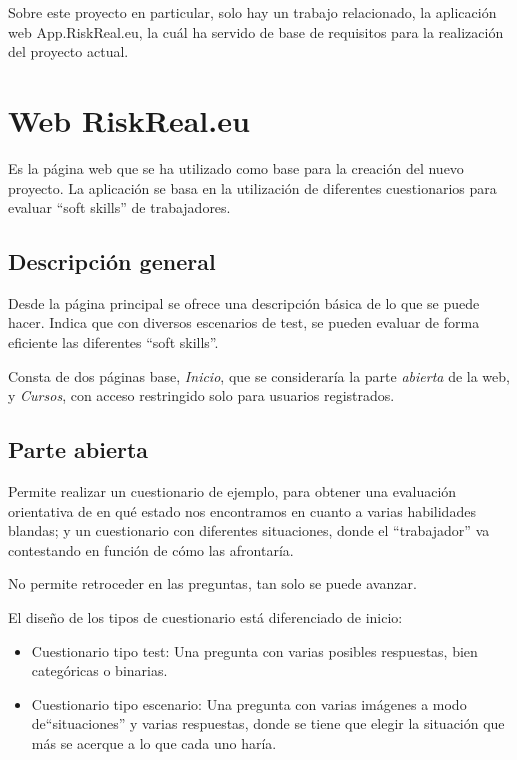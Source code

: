 
Sobre este proyecto en particular, solo hay un trabajo relacionado, la aplicación web App.RiskReal.eu, la cuál ha servido de base de requisitos para la realización del proyecto actual.

\section{Web RiskReal.eu}
Es la página web \cite{web:riskreal} que se ha utilizado como base para la creación del nuevo proyecto.
La aplicación se basa en la utilización de diferentes cuestionarios para evaluar ``soft skills'' de trabajadores.

\subsection{Descripción general}
Desde la página principal se ofrece una descripción básica de lo que se puede hacer.
Indica que con diversos escenarios de test, se pueden evaluar de forma eficiente las diferentes ``soft skills''.

Consta de dos páginas base, \textit{Inicio}, que se consideraría la parte \textit{abierta} de la web, y \textit{Cursos}, con acceso restringido solo para usuarios registrados.

\subsection{Parte abierta}
Permite realizar un cuestionario de ejemplo, para obtener una evaluación orientativa de en qué estado nos encontramos en cuanto a varias habilidades blandas; y un cuestionario con diferentes situaciones, donde el ``trabajador'' va contestando en función de cómo las afrontaría.

No permite retroceder en las preguntas, tan solo se puede avanzar.

El diseño de los tipos de cuestionario está diferenciado de inicio:

\begin{itemize}
	\item Cuestionario tipo test: Una pregunta con varias posibles respuestas, bien categóricas o binarias.
	\item Cuestionario tipo escenario: Una pregunta con varias imágenes a modo de``situaciones'' y varias respuestas, donde se tiene que elegir la situación que más se acerque a lo que cada uno haría.
\end{itemize}

